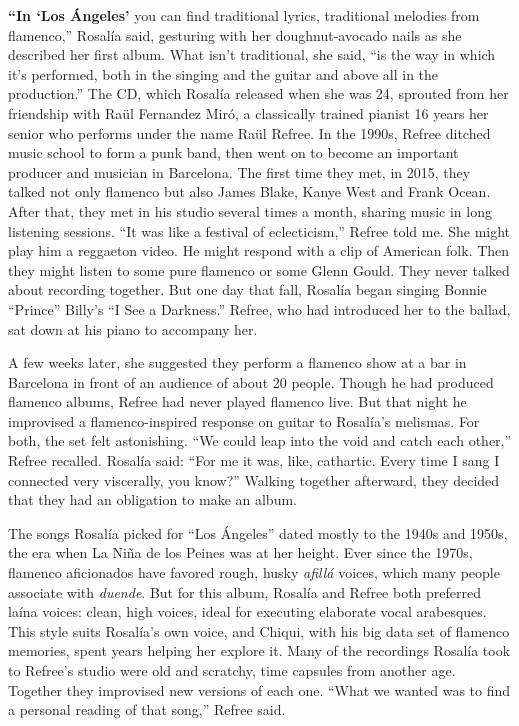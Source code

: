 \textbf{``In `Los Ángeles'} you can find traditional lyrics, traditional
melodies from flamenco,'' Rosalía said, gesturing with her
doughnut-avocado nails as she described her first album. What isn't
traditional, she said, ``is the way in which it's performed, both in the
singing and the guitar and above all in the production.'' The CD, which
Rosalía released when she was 24, sprouted from her friendship with Raül
Fernandez Miró, a classically trained pianist 16 years her senior who
performs under the name Raül Refree. In the 1990s, Refree ditched music
school to form a punk band, then went on to become an important producer
and musician in Barcelona. The first time they met, in 2015, they talked
not only flamenco but also James Blake, Kanye West and Frank Ocean.
After that, they met in his studio several times a month, sharing music
in long listening sessions. ``It was like a festival of eclecticism,''
Refree told me. She might play him a reggaeton video. He might respond
with a clip of American folk. Then they might listen to some pure
flamenco or some Glenn Gould. They never talked about recording
together. But one day that fall, Rosalía began singing Bonnie ``Prince''
Billy's ``I See a Darkness.'' Refree, who had introduced her to the
ballad, sat down at his piano to accompany her.

A few weeks later, she suggested they perform a flamenco show at a bar
in Barcelona in front of an audience of about 20 people. Though he had
produced flamenco albums, Refree had never played flamenco live. But
that night he improvised a flamenco-inspired response on guitar to
Rosalía's melismas. For both, the set felt astonishing. ``We could leap
into the void and catch each other,'' Refree recalled. Rosalía said:
``For me it was, like, cathartic. Every time I sang I connected very
viscerally, you know?'' Walking together afterward, they decided that
they had an obligation to make an album.

The songs Rosalía picked for ``Los Ángeles'' dated mostly to the 1940s
and 1950s, the era when La Niña de los Peines was at her height. Ever
since the 1970s, flamenco aficionados have favored rough, husky
\emph{afillá} voices, which many people associate with \emph{duende}.
But for this album, Rosalía and Refree both preferred laína voices:
clean, high voices, ideal for executing elaborate vocal arabesques. This
style suits Rosalía's own voice, and Chiqui, with his big data set of
flamenco memories, spent years helping her explore it. Many of the
recordings Rosalía took to Refree's studio were old and scratchy, time
capsules from another age. Together they improvised new versions of each
one. ``What we wanted was to find a personal reading of that song,''
Refree said.

